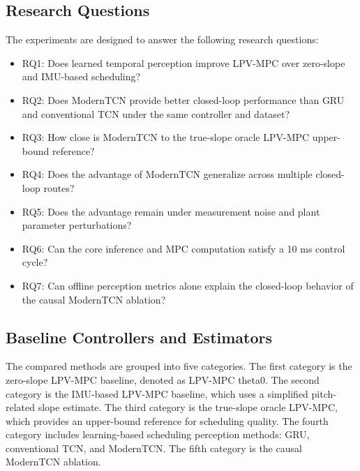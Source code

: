 \documentclass{ieeeaccess}
\begin{document}
\label{sec:experiments}

\subsection{Research Questions}

The experiments are designed to answer the following research questions:

\begin{itemize}

\item RQ1: Does learned temporal perception improve LPV-MPC over zero-slope and IMU-based scheduling?

\item RQ2: Does ModernTCN provide better closed-loop performance than GRU and conventional TCN under the same controller and dataset?

\item RQ3: How close is ModernTCN to the true-slope oracle LPV-MPC upper-bound reference?

\item RQ4: Does the advantage of ModernTCN generalize across multiple closed-loop routes?

\item RQ5: Does the advantage remain under measurement noise and plant parameter perturbations?

\item RQ6: Can the core inference and MPC computation satisfy a 10 ms control cycle?

\item RQ7: Can offline perception metrics alone explain the closed-loop behavior of the causal ModernTCN ablation?

\end{itemize}

\subsection{Baseline Controllers and Estimators}

The compared methods are grouped into five categories. The first category is the zero-slope LPV-MPC baseline, denoted as LPV-MPC theta0. The second category is the IMU-based LPV-MPC baseline, which uses a simplified pitch-related slope estimate. The third category is the true-slope oracle LPV-MPC, which provides an upper-bound reference for scheduling quality. The fourth category includes learning-based scheduling perception methods: GRU, conventional TCN, and ModernTCN. The fifth category is the causal ModernTCN ablation.
\end{document}
